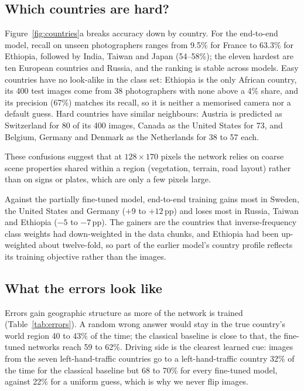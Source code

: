 \documentclass[11pt]{article}
\newcommand{\pp}{\,pp}
\begin{document}
\subsection{Which countries are hard?}\label{sec:countries}
Figure~\ref{fig:countries}a breaks accuracy down by country. For the end-to-end model, recall on unseen
photographers ranges from 9.5\% for France to 63.3\% for Ethiopia, followed by India, Taiwan and Japan
(54--58\%); the eleven hardest are ten European countries and Russia, and the ranking is stable across
models. Easy countries have no look-alike in the class set: Ethiopia is the only African country, its 400
test images come from 38 photographers with none above a 4\% share, and its precision (67\%) matches its
recall, so it is neither a memorised camera nor a default guess. Hard countries have similar neighbours:
Austria is predicted as Switzerland for 80 of its 400 images, Canada as the United States for 73, and
Belgium, Germany and Denmark as the Netherlands for 38 to 57 each.

These confusions suggest that at $128\times170$ pixels the network relies on coarse scene properties shared
within a region (vegetation, terrain, road layout) rather than on signs or plates, which are only a few
pixels large.

Against the partially fine-tuned model, end-to-end training gains most in Sweden, the United States and Germany ($+9$ to $+12$\pp) and loses most in Russia, Taiwan and Ethiopia ($-5$ to $-7$\pp). The gainers
are the countries that inverse-frequency class weights had down-weighted in the data chunks, and Ethiopia
had been up-weighted about twelve-fold, so part of the earlier model's country profile reflects its
training objective rather than the images.

\subsection{What the errors look like}\label{sec:errors}
Errors gain geographic structure as more of the network is trained (Table~\ref{tab:errors}). A random
wrong answer would stay in the true country's world region 40 to 43\% of the time; the classical baseline
is close to that, the fine-tuned networks reach 59 to 62\%. Driving side is the clearest learned cue: images
from the seven left-hand-traffic countries go to a left-hand-traffic country 32\% of the time for the
classical baseline but 68 to 70\% for every fine-tuned model, against 22\% for a uniform guess, which is why
we never flip images.
\end{document}
